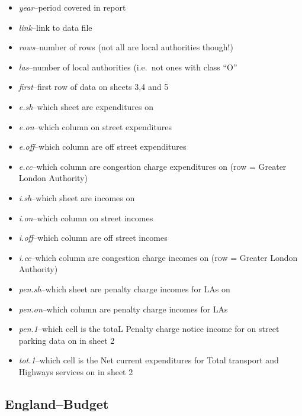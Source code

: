 \documentclass[]{article}
\providecommand{\tightlist}{%
  \setlength{\itemsep}{0pt}\setlength{\parskip}{0pt}}
\begin{document}
\begin{itemize}
\tightlist
\item
  \emph{year}--period covered in report
\item
  \emph{link}--link to data file
\item
  \emph{rows}--number of rows (not all are local authorities though!)
\item
  \emph{las}--number of local authorities (i.e.~not ones with class
  ``O''
\item
  \emph{first}--first row of data on sheets 3,4 and 5
\item
  \emph{e.sh}--which sheet are expenditures on
\item
  \emph{e.on}--which column on street expenditures
\item
  \emph{e.off}--which column are off street expenditures
\item
  \emph{e.cc}--which column are congestion charge expenditures on (row =
  Greater London Authority)
\item
  \emph{i.sh}--which sheet are incomes on
\item
  \emph{i.on}--which column on street incomes
\item
  \emph{i.off}--which column are off street incomes
\item
  \emph{i.cc}--which column are congestion charge incomes on (row =
  Greater London Authority)
\item
  \emph{pen.sh}--which sheet are penalty charge incomes for LAs on
\item
  \emph{pen.on}--which column are penalty charge incomes for LAs
\item
  \emph{pen.1}--which cell is the totaL Penalty charge notice income for
  on street parking data on in sheet 2
\item
  \emph{tot.1}--which cell is the Net current expenditures for Total
  transport and Highways services on in sheet 2
\end{itemize}

\hypertarget{englandbudget}{%
\subsection{England--Budget}\label{englandbudget}}
\end{document}
